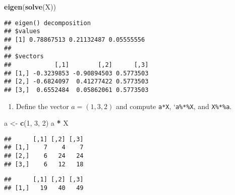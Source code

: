 \documentclass[]{article}
\newenvironment{Shaded}{\begin{snugshade}}{\end{snugshade}}
\newcommand{\KeywordTok}[1]{\textcolor[rgb]{0.13,0.29,0.53}{\textbf{#1}}}
\newcommand{\DecValTok}[1]{\textcolor[rgb]{0.00,0.00,0.81}{#1}}
\newcommand{\StringTok}[1]{\textcolor[rgb]{0.31,0.60,0.02}{#1}}
\newcommand{\OperatorTok}[1]{\textcolor[rgb]{0.81,0.36,0.00}{\textbf{#1}}}
\newcommand{\NormalTok}[1]{#1}
\providecommand{\tightlist}{%
  \setlength{\itemsep}{0pt}\setlength{\parskip}{0pt}}
\begin{document}
\begin{Shaded}
\begin{Highlighting}[]
\KeywordTok{eigen}\NormalTok{(}\KeywordTok{solve}\NormalTok{(X))}
\end{Highlighting}
\end{Shaded}

\begin{verbatim}
## eigen() decomposition
## $values
## [1] 0.78867513 0.21132487 0.05555556
## 
## $vectors
##            [,1]        [,2]      [,3]
## [1,] -0.3239853 -0.90894503 0.5773503
## [2,] -0.6824097  0.41277422 0.5773503
## [3,]  0.6552484  0.05862061 0.5773503
\end{verbatim}

\begin{enumerate}
\def\labelenumi{\arabic{enumi}.}
\setcounter{enumi}{4}
\tightlist
\item
  Define the vector \(a=(1,3,2)\) and compute \texttt{a*X},
  `\texttt{a\%*\%X}, and \texttt{X\%*\%a}.
\end{enumerate}

\begin{Shaded}
\begin{Highlighting}[]
\NormalTok{a <-}\StringTok{ }\KeywordTok{c}\NormalTok{(}\DecValTok{1}\NormalTok{, }\DecValTok{3}\NormalTok{, }\DecValTok{2}\NormalTok{)}
\NormalTok{a }\OperatorTok{*}\StringTok{ }\NormalTok{X}
\end{Highlighting}
\end{Shaded}

\begin{verbatim}
##      [,1] [,2] [,3]
## [1,]    7    4    7
## [2,]    6   24   24
## [3,]    6   12   18
\end{verbatim}

\begin{Shaded}
\end{Shaded}

\begin{verbatim}
##      [,1] [,2] [,3]
## [1,]   19   40   49
\end{verbatim}

\begin{Shaded}
\end{Shaded}
\end{document}
